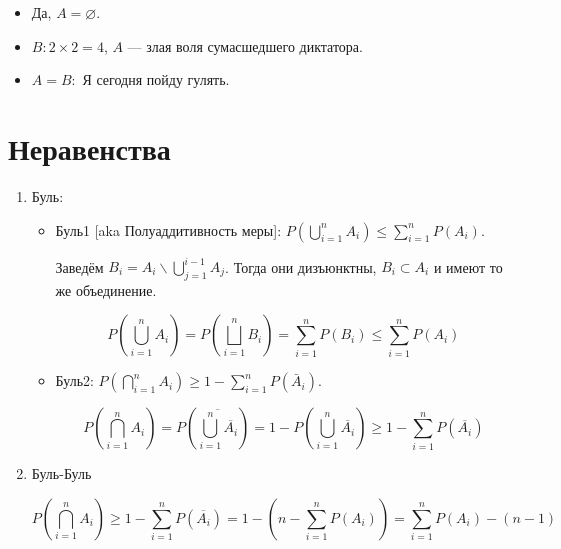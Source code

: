 \documentclass[12pt, a4paper]{article}
\begin{document}
\begin{itemize}
    \item Да, $A = \varnothing$.
    \item $B: 2 × 2 = 4$, $A$ — злая воля сумасшедшего диктатора.
    \item $A = B:$ Я сегодня пойду гулять.
\end{itemize}


\section{Неравенства}

\begin{enumerate}
    \item Буль: \begin{itemize}
        \item Буль1 [aka Полуаддитивность меры]: $P\left(\bigcup_{i=1}^n A_i\right) \leqslant \sum_{i=1}^n P\left(A_i\right)$. 
        
        Заведём $B_i = A_i \backslash \bigcup_{j=1}^{i - 1} A_j$. Тогда они дизъюнктны, $B_i \subset A_i$ и имеют то же объединение.

        \begin{equation}
            P\left(\bigcup_{i=1}^n A_i\right) = P\left(\bigsqcup_{i=1}^n B_i\right) = \sum_{i=1}^n P\left(B_i\right) \leqslant \sum_{i=1}^n P\left(A_i\right)
        \end{equation}
        
        \item Буль2: $P\left(\bigcap_{i=1}^n A_i\right) \geqslant 1-\sum_{i=1}^n P\left(\bar{A}_i\right)$.
        
        \begin{equation}
            P\left(\bigcap_{i=1}^n A_i\right) = P\left(\overline{\bigcup_{i=1}^n \overline{A_i}}\right) = 1 - P\left(\bigcup_{i=1}^n \overline{A_i}\right) \geqslant 1 - \sum_{i=1}^n P\left(\overline{A_i}\right)
        \end{equation}

    \end{itemize}

    \item Буль-Буль
    
    \begin{equation}
        P\left(\bigcap_{i=1}^n A_i\right) \geqslant 1 - \sum_{i=1}^n P\left(\overline{A_i}\right) = 
        1 - \left(n - \sum_{i=1}^n P\left(A_i\right)\right) = \sum_{i=1}^n P\left(A_i\right) - (n - 1)
    \end{equation}


\end{enumerate}
\end{document}
